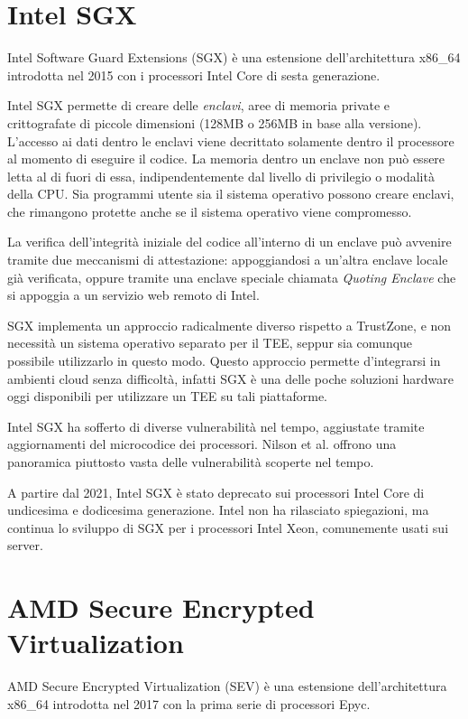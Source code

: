 \documentclass[12pt,italian]{report}
\begin{document}

\section{Intel SGX}
\label{sec:intel-sgx}
Intel Software Guard Extensions (SGX) è una estensione
dell'architettura x86\_64 introdotta nel 2015 con i processori
Intel Core di sesta generazione.

Intel SGX permette di creare delle \textit{enclavi}, aree di memoria private
e crittografate di piccole dimensioni (128MB o 256MB in base alla versione).
L'accesso ai dati dentro le enclavi viene decrittato
solamente dentro il processore al momento di eseguire il codice.
La memoria dentro un enclave non può essere letta al di fuori
di essa, indipendentemente dal livello di privilegio o modalità della CPU.
Sia programmi utente sia il sistema operativo possono creare enclavi,
che rimangono protette anche se il sistema operativo viene compromesso.

La verifica dell'integrità iniziale del codice all'interno di un
enclave può avvenire tramite due meccanismi di attestazione:
appoggiandosi a un'altra enclave locale già verificata, oppure
tramite una enclave speciale chiamata \textit{Quoting Enclave}
che si appoggia a un servizio web remoto di Intel. 

\smallbreak \noindent

SGX implementa un approccio radicalmente diverso rispetto a TrustZone, e
non necessità un sistema operativo separato per il TEE, seppur sia comunque
possibile utilizzarlo in questo modo.
Questo approccio permette d'integrarsi in ambienti cloud senza difficoltà,
infatti SGX è una delle poche soluzioni hardware oggi disponibili
per utilizzare un TEE su tali piattaforme.

\medbreak \noindent

Intel SGX ha sofferto di diverse vulnerabilità nel tempo, aggiustate tramite
aggiornamenti del microcodice dei processori.
Nilson et al.\cite{sgx_vulnerabilities} offrono una panoramica piuttosto
vasta delle vulnerabilità scoperte nel tempo.

\medbreak \noindent

A partire dal 2021, Intel SGX è stato deprecato sui processori Intel Core
di undicesima e dodicesima generazione\cite{sgx_deprecation}.
Intel non ha rilasciato spiegazioni, ma continua lo sviluppo di SGX per
i processori Intel Xeon, comunemente usati sui server. 

\section{AMD Secure Encrypted Virtualization}
\label{sec:amd-sev}
AMD Secure Encrypted Virtualization (SEV) è una estensione dell'architettura
x86\_64 introdotta nel 2017\cite{sev} con la prima serie
di processori Epyc.
\end{document}
